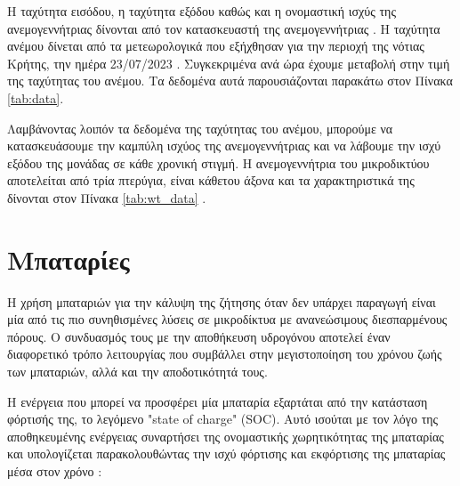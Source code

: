 Η ταχύτητα εισόδου, η ταχύτητα εξόδου καθώς και η ονομαστική ισχύς της ανεμογεννήτριας δίνονται από τον κατασκευαστή της ανεμογεννήτριας \cite{CAU2014820}. Η ταχύτητα ανέμου δίνεται από τα μετεωρολογικά που εξήχθησαν για την περιοχή της νότιας Κρήτης, την ημέρα 23/07/2023 \cite{solcasttoolkit}. Συγκεκριμένα ανά ώρα έχουμε μεταβολή στην τιμή της ταχύτητας του ανέμου. Τα δεδομένα αυτά παρουσιάζονται παρακάτω στον Πίνακα \ref{tab:data}.

Λαμβάνοντας λοιπόν τα δεδομένα της ταχύτητας του ανέμου, μπορούμε να κατασκευάσουμε την καμπύλη ισχύος της ανεμογεννήτριας και να λάβουμε την ισχύ εξόδου της μονάδας σε κάθε χρονική στιγμή. Η ανεμογεννήτρια του μικροδικτύου αποτελείται από τρία πτερύγια, είναι κάθετου άξονα και τα χαρακτηριστικά της δίνονται στον Πίνακα \ref{tab:wt_data} \cite{CAU2014820}.

\section{Μπαταρίες}
Η χρήση μπαταριών για την κάλυψη της ζήτησης όταν δεν υπάρχει παραγωγή είναι μία από τις πιο συνηθισμένες λύσεις σε μικροδίκτυα με ανανεώσιμους διεσπαρμένους πόρους. Ο συνδυασμός τους με την αποθήκευση υδρογόνου αποτελεί έναν διαφορετικό τρόπο λειτουργίας που συμβάλλει στην μεγιστοποίηση του χρόνου ζωής των μπαταριών, αλλά και την αποδοτικότητά τους. 

Η ενέργεια που μπορεί να προσφέρει μία μπαταρία εξαρτάται από την κατάσταση φόρτισής της, το λεγόμενο \en "state of charge" (SOC). \gr Αυτό ισούται με τον λόγο της αποθηκευμένης ενέργειας συναρτήσει της ονομαστικής χωρητικότητας της μπαταρίας και υπολογίζεται παρακολουθώντας την ισχύ φόρτισης και εκφόρτισης της μπαταρίας μέσα στον χρόνο \cite{CAU2014820}:

